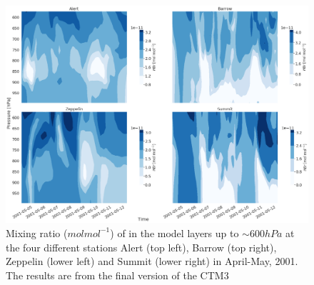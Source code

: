 \begin{figure}[ht]
    \centering
    \includegraphics[width = \linewidth]{Chapter6_Results/images/Vert_StationComp_2001/vertHBr_step4.png}
    \caption{Mixing ratio ($mol mol^{-1}$) of  in the model layers up to $\sim 600 hPa$ at the four different stations Alert (top left), Barrow (top right), Zeppelin (lower left) and Summit (lower right) in April-May, 2001. The results are from the final version of the CTM3}
    \label{fig:vertHBr_step4}
\end{figure}